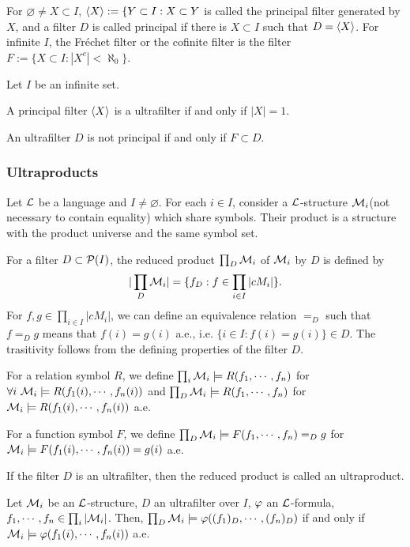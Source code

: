 \documentclass{../../small}
\begin{document}
For $\varnothing\ne X\subset I$, $\langle X\rangle:=\{Y\subset I:X\subset Y$ is called the principal filter generated by $X$, and a filter $D$ is called principal if there is $X\subset I$ such that $D=\langle X\rangle$.
For infinite $I$, the Fr\'echet filter or the cofinite filter is the filter $F:=\{X\subset I:|X^c|<\aleph_0\}$.

\begin{prop*}
Let $I$ be an infinite set.
\begin{parts}
\item A principal filter $\langle X\rangle$ is a ultrafilter if and only if $|X|=1$.
\item An ultrafilter $D$ is not principal if and only if $F\subset D$.
\end{parts}
\end{prop*}

\subsubsection*{Ultraproducts}
Let $\mathcal{L}$ be a language and $I\ne\varnothing$.
For each $i\in I$, consider a $\mathcal{L}$-structure $\mathcal{M}_i$(not necessary to contain equality) which share symbols.
Their product is a structure with the product universe and the same symbol set.

For a filter $D\subset\mathcal{P}(I)$, the reduced product $\prod_D\mathcal{M}_i$ of $\mathcal{M}_i$ by $D$ is defined by
\[|\prod_D\mathcal{M}_i|=\{f_D:f\in\prod_{i\in I}|cM_i|\}.\]
For $f,g\in\prod_{i\in I}|cM_i|$, we can define an equivalence relation $=_D$ such that $f=_Dg$ means that $f(i)=g(i)$ a.e., i.e. $\{i\in I:f(i)=g(i)\}\in D$.
The trasitivity follows from the defining properties of the filter $D$.

For a relation symbol $R$, we define $\prod_i\mathcal{M}_i\models R(f_1,\cdots,f_n)$ for $\forall i\ \cM_i\models R(f_1(i),\cdots,f_n(i))$ and $\prod_D\mathcal{M}_i\models R(f_1,\cdots,f_n)$ for $\mathcal{M}_i\models R(f_1(i),\cdots,f_n(i))$ a.e.

For a function symbol $F$, we define $\prod_D\mathcal{M}_i\models F(f_1,\cdots,f_n)=_Dg$ for $\mathcal{M}_i\models F(f_1(i),\cdots,f_n(i))=g(i)$ a.e.

If the filter $D$ is an ultrafilter, then the reduced product is called an ultraproduct.

\begin{thm*}
Let $\mathcal{M}_i$ be an $\mathcal{L}$-structure, $D$ an ultrafilter over $I$, $\varphi$ an $\mathcal{L}$-formula, $f_1,\cdots,f_n\in\prod_i|\mathcal{M}_i|$.
Then, $\prod_D\mathcal{M}_i\models\varphi((f_1)_D,\cdots,(f_n)_D)$ if and only if $\mathcal{M}_i\models\varphi(f_1(i),\cdots,f_n(i))$ a.e.
\end{thm*}
\end{document}
